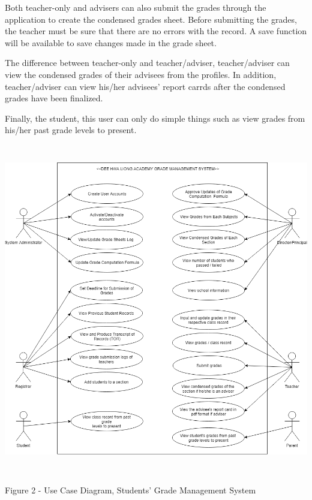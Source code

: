 \documentclass[11pt,a4paper,titlepage]{article}
\begin{document}
Both teacher-only and advisers can also submit the grades through the application to create the condensed grades sheet. Before submitting the grades, the teacher must be sure that there are no errors with the record. A save function will be available to save changes made in the grade sheet.

The difference between teacher-only and teacher/adviser, teacher/adviser can view the condensed grades of their advisees from the profiles. In addition, teacher/adviser can view his/her advisees' report carrds after the condensed grades have been finalized.

Finally, the student, this user can only do simple things such as view grades from his/her past grade levels to present.

\vspace{2cm}
\begin{center}
\includegraphics[height=14.5cm]{Activity-Diagram-1.png}
\end{center}
\vspace{2cm}
\begin{center}
    Figure 2 - Use Case Diagram, Students' Grade Management System
\end{center}

\newpage
\end{document}
